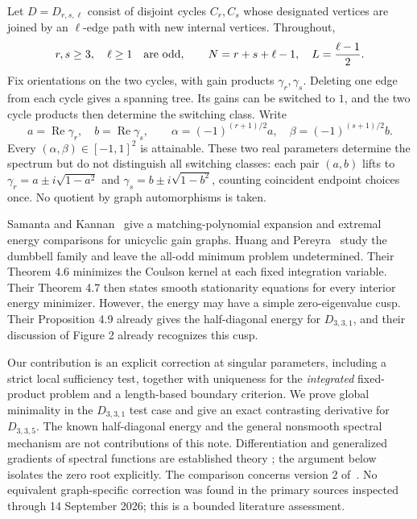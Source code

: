 \documentclass[11pt,a4paper]{article}
\theoremstyle{remark}
\DeclareMathOperator{\Rea}{Re}
\begin{document}
Let $D=D_{r,s,\ell}$ consist of disjoint cycles $C_r,C_s$ whose designated
vertices are joined by an $\ell$-edge path with new internal vertices.
Throughout,
\[
 r,s\geq3,\quad \ell\geq1\quad\hbox{are odd},\qquad
 N=r+s+\ell-1,\quad L=\frac{\ell-1}{2}.
\]
Fix orientations on the two cycles, with gain products $\gamma_r,\gamma_s$.
Deleting one edge from each cycle gives a spanning tree. Its gains can
be switched to $1$, and the two cycle products then determine the
switching class. Write
\begin{equation}\label{eq:normalization}
 a=\Rea\gamma_r,\quad b=\Rea\gamma_s,\qquad
 \alpha=(-1)^{(r+1)/2}a,\quad
 \beta=(-1)^{(s+1)/2}b .
\end{equation}
Every $(\alpha,\beta)\in[-1,1]^2$ is attainable. These two real parameters
determine the spectrum but do not distinguish all switching classes:
each pair $(a,b)$ lifts to
$\gamma_r=a\pm i\sqrt{1-a^2}$ and
$\gamma_s=b\pm i\sqrt{1-b^2}$, counting coincident endpoint choices once.
No quotient by graph automorphisms is taken.

Samanta and Kannan~\cite[Theorem 4.3 and Section 5]{SamantaKannan2025}
give a matching-polynomial expansion and extremal energy comparisons
for unicyclic gain graphs. Huang and Pereyra~\cite{HuangPereyra2026}
study the dumbbell family and leave the all-odd minimum problem
undetermined. Their Theorem 4.6 minimizes the Coulson kernel at each
fixed integration variable. Their Theorem 4.7 then states smooth
stationarity equations for every interior energy minimizer. However,
the energy may have a simple zero-eigenvalue cusp. Their Proposition 4.9
already gives the half-diagonal energy for $D_{3,3,1}$, and their
discussion of Figure 2 already recognizes this cusp.

Our contribution is an explicit correction at singular parameters,
including a strict local sufficiency test, together with uniqueness for
the \emph{integrated} fixed-product problem and a length-based boundary
criterion. We prove global minimality in the $D_{3,3,1}$ test case and
give an exact contrasting derivative for $D_{3,3,5}$. The known
half-diagonal energy and the general nonsmooth spectral mechanism are
not contributions of this note. Differentiation and generalized
gradients of spectral functions are established theory
\cite{Lewis1996}; the argument below isolates the zero root explicitly.
The comparison concerns version 2 of~\cite{HuangPereyra2026}.
No equivalent graph-specific correction was found in the primary
sources inspected through 14 September 2026; this is a bounded
literature assessment.
\end{document}
